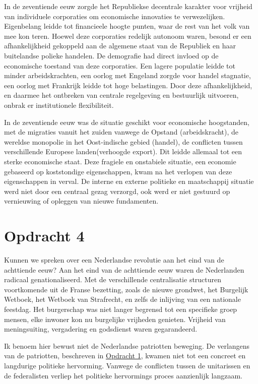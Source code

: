 \documentclass[11pt]{amsart}
\begin{document}
In de zeventiende eeuw zorgde het Republiekse decentrale karakter voor vrijheid van individuele corporaties om economische innovaties te verwezelijken. Eigenbelang leidde tot financieele hoogte punten, waar de rest van het volk van mee kon teren. Hoewel deze corporaties redelijk autonoom waren, besond er een afhankelijkheid gekoppeld aan de algemene staat van de Republiek en haar buitelandse polieke handelen. De demografie had direct invloed op de economische toestand van deze corporaties. Een lagere populatie leidde tot minder arbeidskrachten, een oorlog met Engeland zorgde voor handel stagnatie, een oorlog met Frankrijk leidde tot hoge belastingen. Door deze afhankelijkheid, en daarmee het ontbreken van centrale regelgeving en bestuurlijk uitvoeren, onbrak er institutionele flexibiliteit. 

In de zeventiende eeuw was de situatie geschikt voor economische hoogstanden, met de migraties vanuit het zuiden vanwege de Opstand (arbeidskracht), de wereldse monopolie in het Oost-indische gebied (handel), de conflicten tussen verschillende Europese landen(verhoogde export). Dit leidde allemaal tot een sterke economische staat. Deze fragiele en onstabiele situatie, een economie gebaseerd op koststondige eigenschappen, kwam na het verlopen van deze eigenschappen in verval. De interne en externe politieke en maatschappij situatie werd niet door een centraal gezag verzorgd, ook werd er niet gestuurd op vernieuwing of opleggen van nieuwe fundamenten.

\section*{Opdracht 4}
Kunnen we spreken over een Nederlandse revolutie aan het eind van de achttiende eeuw? Aan het eind van de achttiende eeuw waren de Nederlanden radicaal genationaliseerd. Met de verschillende centralisatie structuren voortkomende uit de Franse bezetting, zoals de nieuwe grondwet, het Burgelijk Wetboek, het Wetboek van Strafrecht, en zelfs de inlijving van een nationale feestdag. Het burgerschap was niet langer begrensd tot een specifieke groep mensen, elke inwoner kon nu burgelijke vrijheden genieten. Vrijheid van meningsuiting, vergadering en godsdienst waren gegarandeerd.

Ik benoem hier bewust niet de Nederlandse patriotten beweging. De verlangens van de patriotten, beschreven in \hyperref[opdracht1]{Opdracht 1}, kwamen niet tot een concreet en langdurige politieke hervorming. Vanwege de conflicten tussen de unitarissen en de federalisten verliep het politieke hervormings proces aanzienlijk langzaam.
\end{document}
